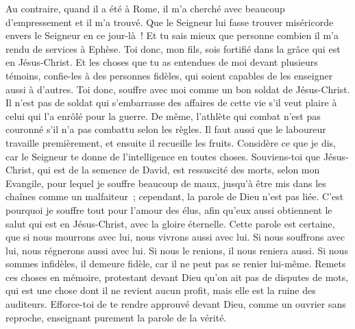 \begin{multicols}{2}
Au contraire, quand il a été à Rome, il m'a cherché avec beaucoup d'empressement et il m'a trouvé.
Que le Seigneur lui fasse trouver miséricorde envers le Seigneur en ce jour-là~! Et tu sais mieux que personne combien il m'a rendu de services à Ephèse.
\VerseOne{}Toi donc, mon fils, sois fortifié dans la grâce qui est en Jésus-Christ.
Et les choses que tu as entendues de moi devant plusieurs témoins, confie-les à des personnes fidèles, qui soient capables de les enseigner aussi à d'autres.
Toi donc, souffre avec moi comme un bon soldat de Jésus-Christ.
Il n'est pas de soldat qui s'embarrasse des affaires de cette vie s'il veut plaire à celui qui l'a enrôlé pour la guerre.
De même, l'athlète qui combat n'est pas couronné s'il n'a pas combattu selon les règles.
Il faut aussi que le laboureur travaille premièrement, et ensuite il recueille les fruits.
Considère ce que je dis, car le Seigneur te donne de l'intelligence en toutes choses.
Souviens-toi que Jésus-Christ, qui est de la semence de David, est ressuscité des morts, selon mon Evangile,
pour lequel je souffre beaucoup de maux, jusqu'à être mis dans les chaînes comme un malfaiteur~; cependant, la parole de Dieu n'est pas liée.
C'est pourquoi je souffre tout pour l'amour des élus, afin qu'eux aussi obtiennent le salut qui est en Jésus-Christ, avec la gloire éternelle.
Cette parole est certaine, que si nous mourrons avec lui, nous vivrons aussi avec lui.
Si nous souffrons avec lui, nous régnerons aussi avec lui. Si nous le renions, il nous reniera aussi.
Si nous sommes infidèles, il demeure fidèle, car il ne peut pas se renier lui-même.
Remets ces choses en mémoire, protestant devant Dieu qu'on ait pas de disputes de mots, qui est une chose dont il ne revient aucun profit, mais elle est la ruine des auditeurs.
Efforce-toi de te rendre approuvé devant Dieu, comme un ouvrier sans reproche, enseignant purement la parole de la vérité.

\end{multicols}
